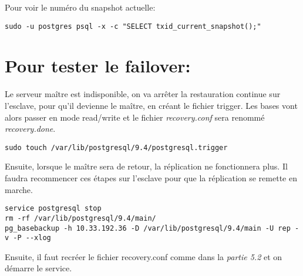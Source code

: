 \vspace{4mm}

Pour voir le numéro du snapshot actuelle:
\smallskip
\begin{Verbatim}[frame=single,framerule=1mm,framesep=3mm,rulecolor=\color{brown}]
sudo -u postgres psql -x -c "SELECT txid_current_snapshot();"
\end{Verbatim}

\section{Pour tester le failover:}

Le serveur maître est indisponible, on va arrêter la restauration continue sur l'esclave, pour qu'il devienne le maître, en créant le fichier trigger. Les bases vont alors passer en mode read/write et le fichier \textit{recovery.conf} sera renommé \textit{recovery.done}.
\smallskip
\begin{Verbatim}[frame=single,framerule=1mm,framesep=3mm,rulecolor=\color{brown}]
sudo touch /var/lib/postgresql/9.4/postgresql.trigger
\end{Verbatim}

Ensuite, lorsque le maître sera de retour, la réplication ne fonctionnera plus. Il faudra recommencer ces étapes sur l'esclave pour que la réplication se remette en marche.

\smallskip
\begin{Verbatim}[frame=single,framerule=1mm,framesep=3mm,rulecolor=\color{brown}]
service postgresql stop
rm -rf /var/lib/postgresql/9.4/main/
pg_basebackup -h 10.33.192.36 -D /var/lib/postgresql/9.4/main -U rep -v -P --xlog
\end{Verbatim}

Ensuite, il faut recréer le fichier recovery.conf comme dans la \textit{partie 5.2} et on démarre le service.
